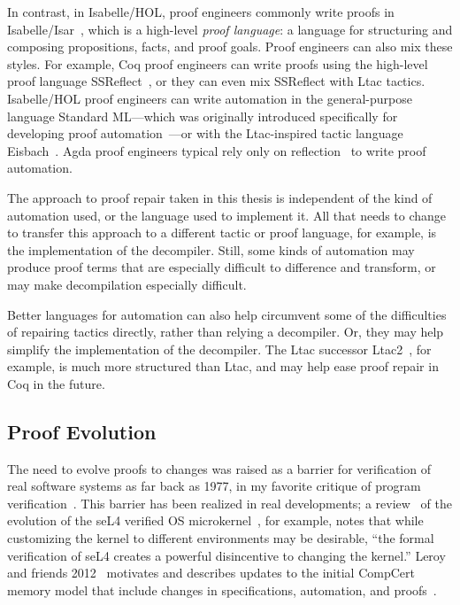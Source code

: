 In contrast, in Isabelle/HOL, proof engineers commonly write proofs in Isabelle/Isar~\cite{wenzel1999isar, Wenzel2007isar}, which is a high-level \textit{proof language}:
a language for structuring and composing propositions, facts, and proof goals.
Proof engineers can also mix these styles.
For example, Coq proof engineers can write proofs using the high-level proof language SSReflect~\cite{Gonthier2010, Gonthier2008},
or they can even mix SSReflect with Ltac tactics.
Isabelle/HOL proof engineers can write automation in the general-purpose language Standard ML---which was originally introduced specifically
for developing proof automation~\cite{Gordon1978}---or with the Ltac-inspired tactic language Eisbach~\cite{Matichuk2015EisbachAP}.
Agda proof engineers typical rely only on reflection~\cite{Demers95reflectionin, harrison-reflection, van2012engineering} to write proof automation.

The approach to proof repair taken in this thesis is independent of the kind of automation used, or the language used to implement it.
All that needs to change to transfer this approach to a different tactic or proof language, for example,
is the implementation of the decompiler.
Still, some kinds of automation may produce proof terms that are especially difficult to difference and transform,
or may make decompilation especially difficult.

Better languages for automation can also help circumvent some of the difficulties of repairing tactics directly, rather than relying a decompiler.
Or, they may help simplify the implementation of the decompiler.
The Ltac successor Ltac2~\cite{ltac2}, for example, is much more structured than Ltac, and may help ease proof repair in Coq in the future.

\subsection{Proof Evolution}
\label{sec:refrep}


The need to evolve proofs to changes was raised as a barrier for verification of real software systems as far back as 1977, in my favorite critique of program verification~\cite{DeMillo1977}.
This barrier has been realized in real developments; a review~\cite{Elphinstone2013} of the evolution of the seL4 verified 
OS microkernel~\cite{Klein2009}, for example, notes that while
customizing the kernel to different environments may be desirable, 
``the formal verification of seL4 creates a powerful disincentive to changing the kernel.''
Leroy and friends 2012~\cite{leroy2012} motivates and describes updates to the initial CompCert memory model
that include changes in specifications, automation, and proofs~\cite{leroy-mem-2010}.

